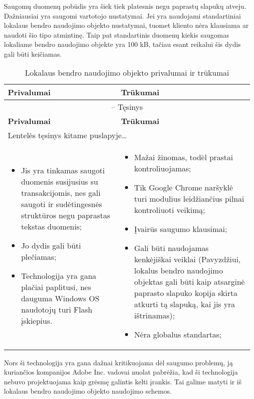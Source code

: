 \documentclass[12pt,a4paper,titlepage]{article}
\begin{document}
Saugomų duomenų pobūdis yra šiek tiek platesnis negu paprastų slapukų atveju. Dažniausiai yra saugomi vartotojo nustatymai. Jei yra naudojami standartiniai lokalaus bendro naudojimo objekto nustatymai, tuomet kliento nėra klausiama ar naudoti šio tipo atmintinę. Taip pat standartinis duomenų kiekis saugomas lokaliame bendro naudojimo objekte yra 100 kB, tačiau esant reikalui šis dydis gali būti keičiamas. 

\begin{longtable}{|p{6.4cm}|p{6.4cm}|}
\caption{Lokalaus bendro naudojimo objekto privalumai ir trūkumai \label{table:flash}}\\

\hline \hline
{\textbf{Privalumai}} &
{\textbf{Trūkumai}}\\
\hline
\endfirsthead


\multicolumn{2}{c}{{\tablename} \thetable{} -- Tęsinys} \\[0.5ex]
\hline \hline
{\textbf{Privalumai}} &
{\textbf{Trūkumai}}\\
\hline
\endhead


\multicolumn{2}{l}{{Lentelės tęsinys kitame puslapyje\ldots}} \\
\endfoot


\hline \hline
\endlastfoot
\hline 
\begin{itemize}
  \item Jis yra tinkamas saugoti duomenis susijusius su transakcijomis, nes gali saugoti ir sudėtingesnės struktūros negu paprastas tekstas duomenis;
  \item Jo dydis gali būti plečiamas;
  \item Technologija yra gana plačiai paplitusi, nes dauguma Windows OS naudotojų turi Flash įskiepius.
\end{itemize}
&
\begin{itemize}
  \item Mažai žinomas, todėl prastai kontroliuojamas;
  \item Tik Google Chrome naršyklė turi modulius leidžiančius pilnai kontroliuoti veikimą;
  \item Įvairūs saugumo klausimai;
  \item Gali būti naudojamas kenkėjiškai veiklai (Pavyzdžiui, lokalus bendro naudojimo objektas gali būti kaip atsarginė paprasto slapuko kopija skirta atkurti tą slapuką, kai jis yra ištrinamas);
  \item Nėra globalus standartas;
\end{itemize}
\end{longtable}
Nors ši technologija yra gana dažnai kritikuojama dėl saugumo problemų, ją kuriančios kompanijos Adobe Inc. vadovai nuolat pabrėžia, kad ši technologija nebuvo projektuojama kaip grėsmę galintis kelti įrankis. Tai galime matyti ir iš lokalaus bendro naudojimo objekto naudojimo schemos.
\end{document}
